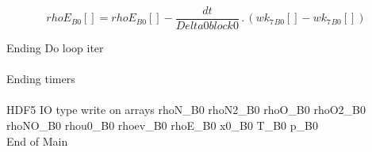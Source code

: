 \documentclass{article}
\begin{document}
\begin{dmath}{rhoE{_{B0}}}[{}] = {rhoE{_{B0}}}[{}] - \frac{dt}{Delta0block0} \,.\, \left({wk_{7}{_{B0}}}[{}] - {wk_{7}{_{B0}}}[{}]\right)\end{dmath}

\noindent Ending Do loop iter\\
\\\noindent Ending timers\\
\\\noindent HDF5 IO type write on arrays rhoN_B0 rhoN2_B0 rhoO_B0 rhoO2_B0 rhoNO_B0 rhou0_B0 rhoev_B0 rhoE_B0 x0_B0 T_B0 p_B0\\\noindent End of Main\\
\end{document}
